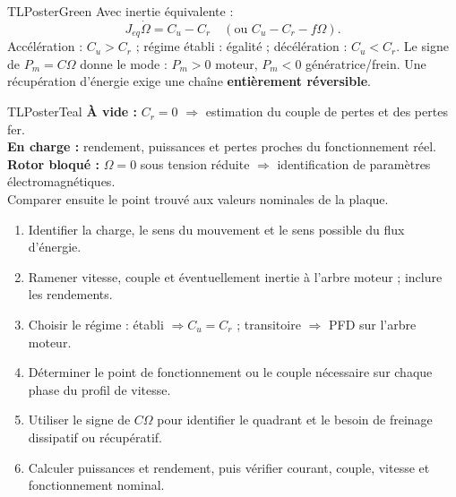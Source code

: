 \documentclass[10pt,a3paper]{article}
\begin{document}
\begin{minipage}[t]{0.49\linewidth}
\begin{TLPosterBloc}{TLPosterGreen}
Avec inertie équivalente :
\[
J_{eq}\dot\Omega=C_u-C_r\quad(\text{ou }C_u-C_r-f\Omega).
\]
Accélération : $C_u>C_r$ ; régime établi : égalité ; décélération : $C_u<C_r$. Le signe de $P_m=C\Omega$ donne le mode : $P_m>0$ moteur, $P_m<0$ génératrice/frein. Une récupération d'énergie exige une chaîne \textbf{entièrement réversible}.
\end{TLPosterBloc}
\begin{TLPosterBloc}{TLPosterTeal}
\textbf{À vide :} $C_r=0$ $\Rightarrow$ estimation du couple de pertes et des pertes fer.\\
\textbf{En charge :} rendement, puissances et pertes proches du fonctionnement réel.\\
\textbf{Rotor bloqué :} $\Omega=0$ sous tension réduite $\Rightarrow$ identification de paramètres électromagnétiques.\\[1mm]
Comparer ensuite le point trouvé aux valeurs nominales de la plaque.
\end{TLPosterBloc}
\end{minipage}
\vfill
\begin{TLPosterMethode}
\begin{enumerate}
  \item Identifier la charge, le sens du mouvement et le sens possible du flux d'énergie.
  \item Ramener vitesse, couple et éventuellement inertie à l'arbre moteur ; inclure les rendements.
  \item Choisir le régime : établi $\Rightarrow C_u=C_r$ ; transitoire $\Rightarrow$ PFD sur l'arbre moteur.
  \item Déterminer le point de fonctionnement ou le couple nécessaire sur chaque phase du profil de vitesse.
  \item Utiliser le signe de $C\Omega$ pour identifier le quadrant et le besoin de freinage dissipatif ou récupératif.
  \item Calculer puissances et rendement, puis vérifier courant, couple, vitesse et fonctionnement nominal.
\end{enumerate}
\end{TLPosterMethode}
\vfill
{}
\end{document}
